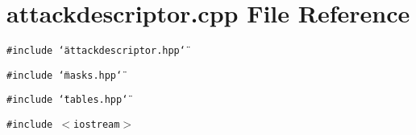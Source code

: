 \section{attackdescriptor.cpp File Reference}
\label{attackdescriptor_8cpp}
{\tt \#include \char`\"{}attackdescriptor.hpp\char`\"{}}\par
{\tt \#include \char`\"{}masks.hpp\char`\"{}}\par
{\tt \#include \char`\"{}tables.hpp\char`\"{}}\par
{\tt \#include $<$iostream$>$}\par
